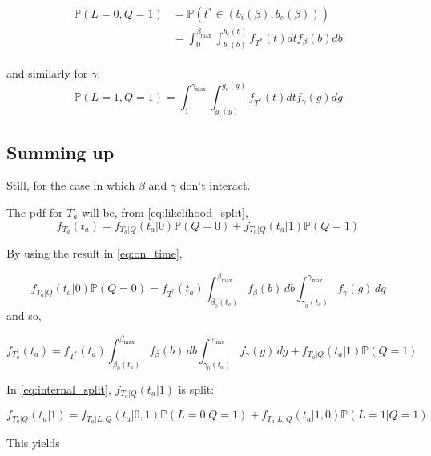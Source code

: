 \documentclass{article}
\begin{document}
\begin{align}
  \label{eq:prob_int_beta}
  \begin{split}
    \mathbb{P}(L=0, Q=1) & =\mathbb{P}(t^* \in (b_i(\beta), b_e(\beta))) \\
    & = \int_0^{\beta_\text{max}}\int_{b_i(b)}^{b_e(b)} f_{T^*}(t)dtf_\beta(b)db
      \end{split}
\end{align}

and similarly for \(\gamma\),
\begin{equation}
  \label{eq:prob_in_gamma}
  \mathbb{P}(L=1, Q=1) = \int_1^{\gamma_\text{max}}\int_{g_i(g)}^{g_e(g)} f_{T^*}(t)dtf_\gamma(g)dg
\end{equation}

\subsection{Summing up}

Still, for the case in which \(\beta\) and \(\gamma\) don't interact.

The pdf for \(T_a\) will be, from \eqref{eq:likelihood_split},
\begin{equation*}
  f_{T_a}(t_a) = f_{T_a | Q}(t_a | 0)\mathbb{P}(Q = 0) + f_{T_a | Q}(t_a | 1)\mathbb{P}(Q = 1)
\end{equation*}

By using the result in \eqref{eq:on_time},

\begin{equation*}
  f_{T_a | Q}(t_a | 0)\mathbb{P}(Q = 0) = f_{T^*}(t_a)\int_{\beta_0(t_a)}^{\beta_\text{max}}f_\beta(b)\, db\int_{\gamma_0(t_a)}^{\gamma_\text{max}}f_\gamma(g)\, dg
\end{equation*}
and so,

\begin{equation*}
  f_{T_a}(t_a) = f_{T^*}(t_a)\int_{\beta_0(t_a)}^{\beta_\text{max}}f_\beta(b)\, db\int_{\gamma_0(t_a)}^{\gamma_\text{max}}f_\gamma(g)\, dg + f_{T_a | Q}(t_a | 1)\mathbb{P}(Q = 1)
\end{equation*}

In \eqref{eq:internal_split}, \(f_{T_a | Q}(t_a | 1)\) is split:

\begin{equation*}
  f_{T_a | Q}(t_a | 1) =  f_{T_a | L, Q}(t_a | 0, 1) \mathbb{P}(L=0 | Q=1) + f_{T_a | L, Q}(t_a | 1, 0) \mathbb{P}(L=1 | Q=1)
\end{equation*}

This yields
\end{document}
